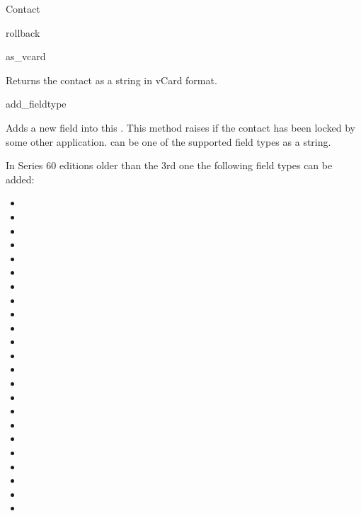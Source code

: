 \begin{classdesc*}{Contact}
\begin{methoddesc}[Contact]{rollback}{}
\end{methoddesc}

\begin{methoddesc}[Contact]{as_vcard}{}

Returns the contact as a string in vCard format.

\end{methoddesc}

\begin{methoddesc}[Contact]{add_field}{type }

Adds a new field into this . This method raises 
 if the contact has been locked by some other 
application.  can be one of the supported field types as a 
string. 

In Series 60 editions older than the 3rd one the following field types can 
be added:

\begin{itemize}
\item {}
\item {}
\item {}
\item {}
\item {}
\item {}
\item {}
\item {}
\item {}
\item {}
\item {}
\item {}
\item {}
\item {}
\item {}
\item {}
\item {}
\item {}
\item {}
\item {}
\item {}
\item {}
\item {}
\end{itemize}


\end{methoddesc}
\end{classdesc*}
